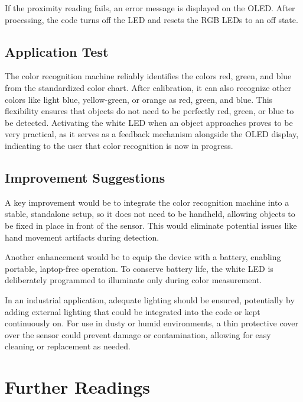 If the proximity reading fails, an error message is displayed on the OLED. After processing, the code turns off the LED and resets the RGB LEDs to an off state.



\subsection{Application Test}

The color recognition machine reliably identifies the colors red, green, and blue from the standardized color chart. After calibration, it can also recognize other colors like light blue, yellow-green, or orange as red, green, and blue. This flexibility ensures that objects do not need to be perfectly red, green, or blue to be detected. Activating the white LED when an object approaches proves to be very practical, as it serves as a feedback mechanism alongside the OLED display, indicating to the user that color recognition is now in progress.

\subsection{Improvement Suggestions}

A key improvement would be to integrate the color recognition machine into a stable, standalone setup, so it does not need to be handheld, allowing objects to be fixed in place in front of the sensor. This would eliminate potential issues like hand movement artifacts during detection.

Another enhancement would be to equip the device with a battery, enabling portable, laptop-free operation. To conserve battery life, the white LED is deliberately programmed to illuminate only during color measurement. 

In an industrial application, adequate lighting should be ensured, potentially by adding external lighting that could be integrated into the code or kept continuously on. For use in dusty or humid environments, a thin protective cover over the sensor could prevent damage or contamination, allowing for easy cleaning or replacement as needed.

\section{Further Readings}

